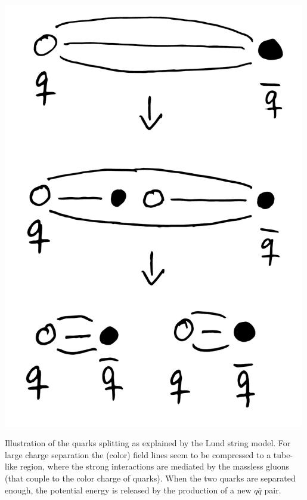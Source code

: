 \begin{marginfigure}
  \centerfloat
  \includegraphics[width=0.99\textwidth]{figures/quark_splitting/quark_splitting.pdf}
  \caption[Quark splitting]{Illustration of the quarks splitting as explained by the Lund string model. For large charge separation the (color) field lines seem to be compressed to a tube-like region, where the strong interactions are mediated by the massless gluons (that couple to the color charge of quarks). When the two quarks are separated enough, the potential energy is released by the production of a new $q\bar{q}$ pair.}
  \label{fig:hep:quark_splitting_strings}
\end{marginfigure}

